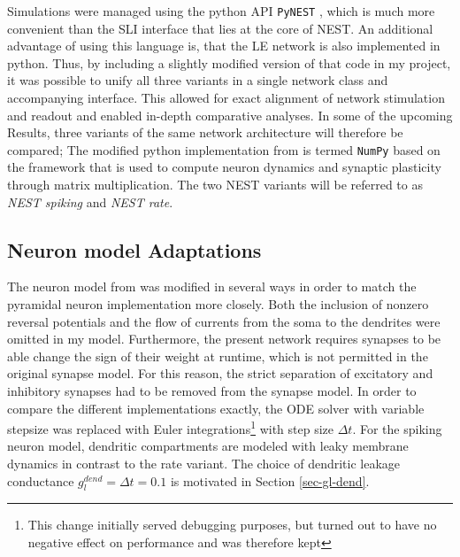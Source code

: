 Simulations were managed using the python API \texttt{PyNEST} \citep{Eppler2009}, which is much more convenient than the
SLI interface that lies at the core of NEST. An additional advantage of using this language is, that the LE network  is
also implemented in python. Thus, by including a slightly modified version of that code in my project, it was possible
to unify all three variants in a single network class and accompanying interface. This allowed for exact alignment of
network stimulation and readout and enabled in-depth comparative analyses. In some of the upcoming Results, three
variants of the same network architecture will therefore be compared; The modified python implementation from
\citep{Haider2021} is termed \texttt{NumPy} based on the framework that is used to compute neuron dynamics and synaptic
plasticity through matrix multiplication. The two NEST variants will be referred to as \textit{NEST spiking} and
\textit{NEST rate}. 

\subsection{Neuron model Adaptations}

The neuron model from \citep{Stapmanns2021} was modified in several ways in order to match the pyramidal neuron
implementation more closely. Both the inclusion of nonzero reversal potentials and the flow of currents from the soma to
the dendrites were omitted in my model. Furthermore, the present network requires synapses to be able
change the sign of their weight at runtime, which is not permitted in the original synapse model. For this reason, the
strict separation of excitatory and inhibitory synapses had to be removed from the synapse model. In order to compare
the different implementations exactly, the ODE solver with variable stepsize was replaced with Euler
integrations\footnote{This change initially served debugging purposes, but turned out to have no negative effect on
performance and was therefore kept} with step size $\Delta t$. For the spiking neuron model, dendritic compartments are
modeled with leaky membrane dynamics in contrast to the rate variant. The choice of dendritic leakage conductance
$g_l^{dend}=\Delta t=0.1$ is motivated in Section \ref{sec-gl-dend}.

